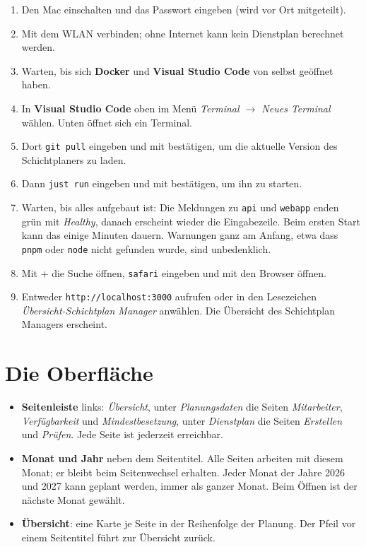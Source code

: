 \documentclass[11pt]{combiArticle}
\newcommand{\code}[1]{\texttt{#1}}
\newcommand{\taste}[1]{\fbox{\small\strut #1}}
\begin{document}
\begin{enumerate}
  \item Den Mac einschalten und das Passwort eingeben (wird vor Ort mitgeteilt).
  \item Mit dem WLAN verbinden; ohne Internet kann kein Dienstplan berechnet werden.
  \item Warten, bis sich \textbf{Docker} und \textbf{Visual Studio Code} von selbst geöffnet haben.
  \item In \textbf{Visual Studio Code} oben im Menü \emph{Terminal $\to$ Neues Terminal} wählen. Unten öffnet sich ein
        Terminal.
  \item Dort \code{git pull} eingeben und mit \taste{Enter} bestätigen, um die aktuelle Version des Schichtplaners
        zu laden.
  \item Dann \code{just run} eingeben und mit \taste{Enter} bestätigen, um ihn zu starten.
  \item Warten, bis alles aufgebaut ist: Die Meldungen zu \code{api} und \code{webapp} enden grün mit
        \emph{Healthy}, danach erscheint wieder die Eingabezeile. Beim ersten Start kann das einige Minuten
        dauern. Warnungen ganz am Anfang, etwa dass \code{pnpm} oder \code{node} nicht gefunden wurde, sind
        unbedenklich.
  \item Mit \taste{cmd} + \taste{Leertaste} die Suche öffnen, \code{safari} eingeben und mit \taste{Enter} den
        Browser öffnen.
  \item Entweder \code{http://localhost:3000} aufrufen oder in den Lesezeichen
        \emph{Übersicht-Schichtplan Manager} anwählen. Die Übersicht des Schichtplan Managers erscheint.
\end{enumerate}

\section{Die Oberfläche}\label{sec:oberflaeche}

\begin{itemize}
  \item \textbf{Seitenleiste} links: \emph{Übersicht}, unter \emph{Planungsdaten} die Seiten
        \emph{Mitarbeiter}, \emph{Verfügbarkeit} und \emph{Mindestbesetzung}, unter \emph{Dienstplan} die Seiten
        \emph{Erstellen} und \emph{Prüfen}. Jede Seite ist jederzeit erreichbar.
  \item \textbf{Monat und Jahr} neben dem Seitentitel. Alle Seiten arbeiten mit diesem Monat; er bleibt beim
        Seitenwechsel erhalten. Jeder Monat der Jahre 2026 und 2027 kann geplant werden, immer als ganzer Monat.
        Beim Öffnen ist der nächste Monat gewählt.
  \item \textbf{Übersicht}: eine Karte je Seite in der Reihenfolge der Planung. Der Pfeil vor einem
        Seitentitel führt zur Übersicht zurück.
\end{itemize}
\end{document}
